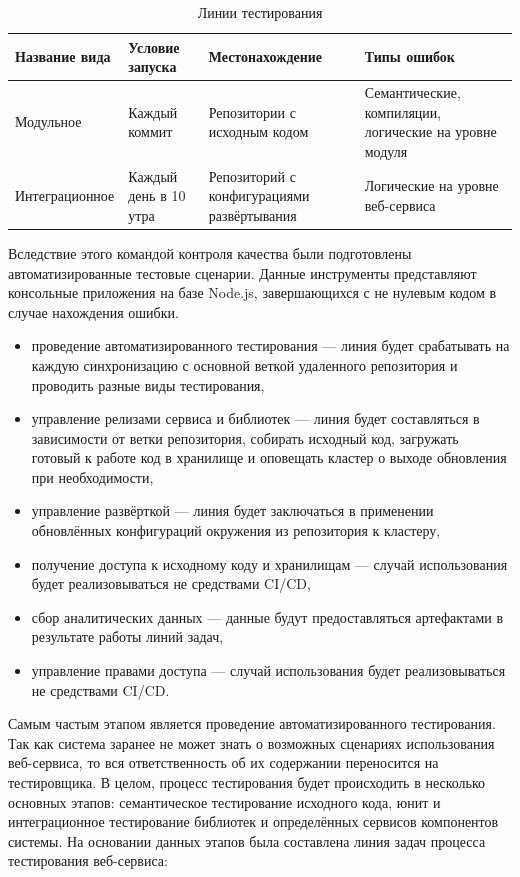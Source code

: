 \begin{center}
    \begin{longtable}{|p{}|p{}|p{}|p{}|}
        \caption{Линии тестирования}
        \label{tab:test-kinds}
        \hline
        Название вида   & Условие запуска       & Местонахождение                               & Типы ошибок   \\
        \hline
        Модульное       & Каждый коммит         & Репозитории с исходным кодом                  & Семантические, компиляции, логические на уровне модуля    \\
        Интеграционное  & Каждый день в 10 утра & Репозиторий с конфигурациями развёртывания    & Логические на уровне веб-сервиса                          \\
        \hline
    \end{longtable}
\end{center}

Вследствие этого командой контроля качества были подготовлены автоматизированные тестовые сценарии.
Данные инструменты представляют консольные приложения на базе Node.js,
завершающихся с не нулевым кодом в случае нахождения ошибки.

\begin{itemize}
    \item проведение автоматизированного тестирования --- линия будет срабатывать на каждую синхронизацию с основной веткой удаленного репозитория и проводить разные виды тестирования,
    \item управление релизами сервиса и библиотек --- линия будет составляться в зависимости от ветки репозитория, собирать исходный код, загружать готовый к работе код в хранилище и
    оповещать кластер о выходе обновления при необходимости,
    \item управление развёрткой --- линия будет заключаться в применении обновлённых конфигураций окружения из репозитория к кластеру,
    \item получение доступа к исходному коду и хранилищам --- случай использования будет реализовываться не средствами CI/CD,
    \item сбор аналитических данных --- данные будут предоставляться артефактами в результате работы линий задач,
    \item управление правами доступа --- случай использования будет реализовываться не средствами CI/CD.
\end{itemize}

Самым частым этапом является проведение автоматизированного тестирования.
Так как система заранее не может знать о возможных сценариях использования веб-сервиса, то вся ответственность об их содержании переносится на тестировщика.
В целом, процесс тестирования будет происходить в несколько основных этапов: семантическое тестирование исходного кода, юнит и интеграционное тестирование библиотек и
определённых сервисов компонентов системы.
На основании данных этапов была составлена линия задач процесса тестирования веб-сервиса:

